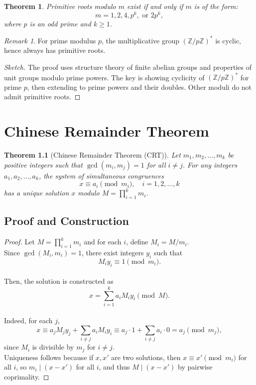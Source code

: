 \documentclass[12pt,openany]{book}
\theoremstyle{definition}
\theoremstyle{plain}
\newtheorem{theorem}{Theorem}[chapter]
\theoremstyle{remark}
\newtheorem{remark}{Remark}[chapter]
\begin{document}
\begin{theorem}
  Primitive roots modulo $m$ exist if and only if $m$ is of the form:
  \[
    m = 1, 2, 4, p^k, \text{ or } 2 p^k,
  \]
  where $p$ is an odd prime and $k \geq 1$.
\end{theorem}

\begin{remark}
  For prime modulus $p$, the multiplicative group $(\mathbb{Z}/p\mathbb{Z})^*$ is cyclic, hence always has primitive roots.
\end{remark}

\begin{proof}[Sketch]
  The proof uses structure theory of finite abelian groups and properties of unit groups modulo prime powers. The key is showing cyclicity of $(\mathbb{Z}/p\mathbb{Z})^*$ for prime $p$, then extending to prime powers and their doubles. Other moduli do not admit primitive roots.
\end{proof}


\chapter{Chinese Remainder Theorem}

\begin{theorem}[Chinese Remainder Theorem (CRT)]
  Let $m_1, m_2, \dots, m_k$ be positive integers such that $\gcd(m_i, m_j) = 1$ for all $i \neq j$. For any integers $a_1, a_2, \dots, a_k$, the system of simultaneous congruences
  \[
    x \equiv a_i \pmod{m_i}, \quad i = 1, 2, \dots, k
  \]
  has a unique solution $x$ modulo $M = \prod_{i=1}^k m_i$.
\end{theorem}

\section{Proof and Construction}

\begin{proof}
  Let $M = \prod_{i=1}^k m_i$ and for each $i$, define $M_i = M / m_i$.
  \noindent
  \\
  Since $\gcd(M_i, m_i) = 1$, there exist integers $y_i$ such that
  \[
    M_i y_i \equiv 1 \pmod{m_i}.
  \]
  \noindent
  \\
  Then, the solution is constructed as
  \[
    x = \sum_{i=1}^k a_i M_i y_i \pmod{M}.
  \]
  \noindent
  \\
  Indeed, for each $j$,
  \[
    x \equiv a_j M_j y_j + \sum_{i \neq j} a_i M_i y_i \equiv a_j \cdot 1 + \sum_{i \neq j} a_i \cdot 0 = a_j \pmod{m_j},
  \]
  since $M_i$ is divisible by $m_j$ for $i \neq j$.
  \noindent
  \\
  Uniqueness follows because if $x, x'$ are two solutions, then $x \equiv x' \pmod{m_i}$ for all $i$, so $m_i \mid (x - x')$ for all $i$, and thus $M \mid (x - x')$ by pairwise coprimality.
\end{proof}
\end{document}
